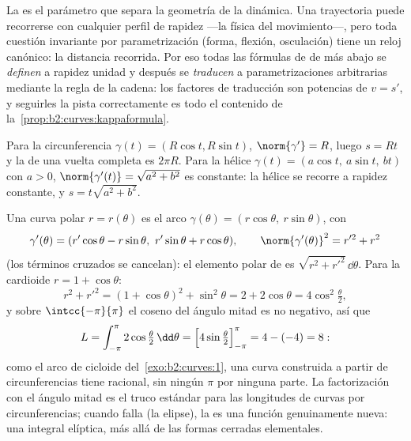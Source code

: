 \begin{remark}
La  es el parámetro que separa la geometría de la
dinámica. Una trayectoria puede recorrerse con cualquier perfil de
rapidez ---la física del movimiento---, pero toda cuestión
invariante por parametrización (forma, flexión, osculación) tiene un
reloj canónico: la distancia recorrida. Por eso todas las fórmulas
de  de más abajo se \emph{definen} a rapidez unidad y
después se \emph{traducen} a parametrizaciones arbitrarias mediante
la regla de la cadena: los factores de traducción son potencias de $v
= s'$, y seguirles la pista correctamente es todo el contenido de la~\cref{prop:b2:curves:kappaformula}.
\end{remark}

\begin{example}\label{ex:b2:curves:helix}
Para la circunferencia $\gamma(t) = (R\cos t, R\sin t)$,
$\norm{\gamma'} = R$, luego $s = Rt$ y la  de una vuelta
completa es $2\pi R$. Para la hélice $\gamma(t) = (a\cos t,\ a\sin
t,\ bt)$ con $a > 0$, $\norm{\gamma'(t)} = \sqrt{a^2 + b^2}$ es
constante: la hélice se recorre a rapidez constante, y $s =
t\sqrt{a^2 + b^2}$.
\end{example}

\begin{example}\label{ex:b2:curves:polarlength}
Una curva polar $r = r(\theta)$ es el arco $\gamma(\theta) =
(r\cos\theta,\ r\sin\theta)$, con
\[
\gamma'(\theta) = (r'\cos\theta - r\sin\theta,\
r'\sin\theta + r\cos\theta),
\qquad
\norm{\gamma'(\theta)}^2 = r'^2 + r^2
\]
(los términos cruzados se cancelan): el elemento polar de
 es $\sqrt{r^2 + r'^2}\,\dd\theta$. Para la cardioide $r =
1 + \cos\theta$:
\[
r^2 + r'^2 = (1 + \cos\theta)^2 + \sin^2\theta = 2 +
2\cos\theta = 4\cos^2\tfrac\theta2,
\]
y sobre $\intcc{-\pi}{\pi}$ el coseno del ángulo mitad es no
negativo, así que
\[
L = \int_{-\pi}^{\pi}2\cos\tfrac\theta2\,\dd\theta
= \Bigl[4\sin\tfrac\theta2\Bigr]_{-\pi}^{\pi}
= 4 - (-4) = 8 :
\]
como el arco de cicloide del~\cref{exo:b2:curves:1}, una curva
construida a partir de circunferencias tiene  racional, sin
ningún $\pi$ por ninguna parte. La factorización con el ángulo mitad
es el truco estándar para las longitudes de curvas  por
circunferencias; cuando falla (la elipse), la \omterm{def:b2:curves:length}{longitud} es una
función genuinamente nueva: una integral elíptica, más allá de las
formas cerradas elementales.
\end{example}

